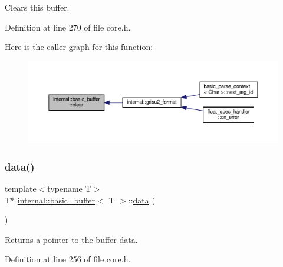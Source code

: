 Clears this buffer. 

Definition at line 270 of file core.\+h.

Here is the caller graph for this function\+:
\nopagebreak
\begin{figure}[H]
\begin{center}
\leavevmode
\includegraphics[width=350pt]{classinternal_1_1basic__buffer_a9a18325765c5245d1861874512355b72_icgraph}
\end{center}
\end{figure}
\mbox{\label{classinternal_1_1basic__buffer_ab4a96d7d4394f469568d290fde5a75a7}} 
\subsubsection{\texorpdfstring{data()}{data()}\hspace{0.1cm}{\footnotesize\ttfamily [1/2]}}
{\footnotesize\ttfamily template$<$typename T$>$ \\
T$\ast$ \hyperlink{classinternal_1_1basic__buffer}{internal\+::basic\+\_\+buffer}$<$ T $>$\+::\hyperlink{namespaceinternal_adc3036f1841136e36e29e5fd339de1a1}{data} (\begin{DoxyParamCaption}{ }\end{DoxyParamCaption})\hspace{0.3cm}{\ttfamily [inline]}}

Returns a pointer to the buffer data. 

Definition at line 256 of file core.\+h.

